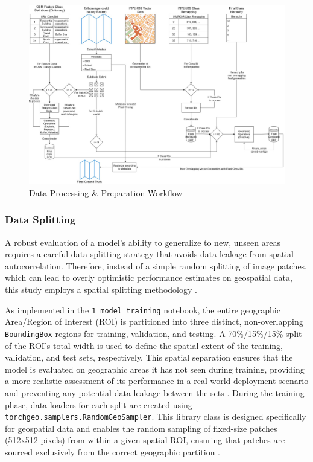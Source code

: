 \documentclass{report}
\begin{document}
\newpage
\begin{figure}
    \includegraphics[width=\textwidth]{own_images/Workflow.jpg}
    \caption{Data Processing \& Preparation Workflow}
    \label{fig:data_processing_workflow}
\end{figure}


\subsubsection{Data Splitting}
A robust evaluation of a model's ability to generalize to new, unseen areas requires a careful data splitting strategy that avoids data leakage from spatial autocorrelation. Therefore, instead of a simple random splitting of image patches, which can lead to overly optimistic performance estimates on geospatial data, this study employs a spatial splitting methodology \parencites[p.~1ff.]{FengEtAlInformationLeakageDeepLearningBasedHyperspectralImageClassificationSurvey2023}[]{StewartEtAlTorchGeoDeepLearningGeospatialData2024}.

As implemented in the \texttt{1\_model\_training} notebook, the entire geographic Area/Region of Interest (ROI) is partitioned into three distinct, non-overlapping \texttt{BoundingBox} regions for training, validation, and testing. A 70\%/15\%/15\% split of the ROI's total width is used to define the spatial extent of the training, validation, and test sets, respectively. This spatial separation ensures that the model is evaluated on geographic areas it has not seen during training, providing a more realistic assessment of its performance in a real-world deployment scenario and preventing any potential data leakage between the sets \parencite[p.~3.]{FengEtAlInformationLeakageDeepLearningBasedHyperspectralImageClassificationSurvey2023}. During the training phase, data loaders for each split are created using \texttt{torchgeo.samplers.RandomGeoSampler}. This library class is designed specifically for geospatial data and enables the random sampling of fixed-size patches (512x512 pixels) from within a given spatial ROI, ensuring that patches are sourced exclusively from the correct geographic partition \parencite{StewartEtAlTorchGeoDeepLearningGeospatialData2024}.
\end{document}
